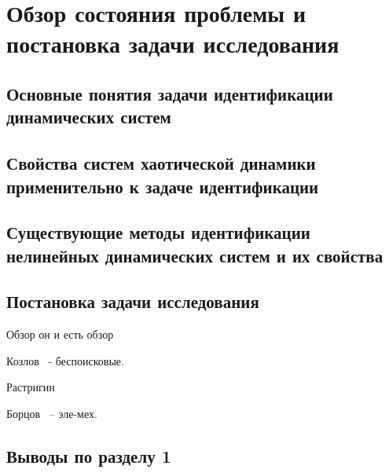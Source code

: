 \chapter{Обзор состояния проблемы и постановка задачи исследования}

\section{Основные понятия задачи идентификации динамических систем}

\section{Свойства систем хаотической динамики применительно к задаче идентификации}

\section{Существующие методы идентификации нелинейных динамических систем и их свойства}




\section{Постановка задачи исследования}

Обзор он и есть обзор

Козлов~\cite{kozlov_nosearch_sns} - беспоисковые.

Растригин~\cite{rastr_stat_meth_search,rastr_seu,rastr_intro,rastr_adop_complex_sys,rastr_rand_search}

Борцов~\cite{borcov} -- эле-мех.

\section{Выводы по разделу 1}

